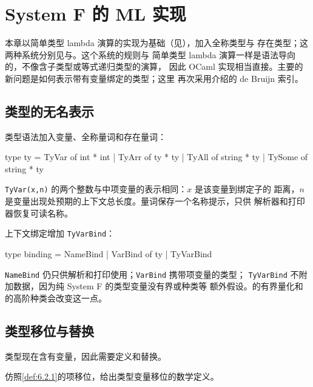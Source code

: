
\chapter{System F 的 ML 实现}
\label{chap:25}

本章以简单类型 lambda 演算的实现为基础（见），加入全称类型与
存在类型；这两种系统分别见与。这个系统的规则与
简单类型 lambda 演算一样是语法导向的，不像含子类型或等式递归类型的演算，
因此 OCaml 实现相当直接。主要的新问题是如何表示带有变量绑定的类型；这里
再次采用介绍的 de Bruijn 索引。

\section{类型的无名表示}
\label{sec:25.1}

类型语法加入变量、全称量词和存在量词：
\begin{taplocamlcode}
type ty =
    TyVar of int * int
  | TyArr of ty * ty
  | TyAll of string * ty
  | TySome of string * ty
\end{taplocamlcode}

\texttt{TyVar(x,n)} 的两个整数与中项变量的表示相同：\(x\) 是该变量到绑定子的
距离，\(n\) 是变量出现处预期的上下文总长度。量词保存一个名称提示，只供
解析器和打印器恢复可读名称。

上下文绑定增加 \texttt{TyVarBind}：
\begin{taplocamlcode}
type binding =
    NameBind
  | VarBind of ty
  | TyVarBind
\end{taplocamlcode}

\texttt{NameBind} 仍只供解析和打印使用；\texttt{VarBind} 携带项变量的类型；
\texttt{TyVarBind} 不附加数据，因为纯 System F 的类型变量没有界或种类等
额外假设。的有界量化和的高阶种类会改变这一点。

\section{类型移位与替换}
\label{sec:25.2}

类型现在含有变量，因此需要定义和替换。

\begin{exercise}[\(\star\)]
\label{ex:25.2.1}
仿照\cref{def:6.2.1}的项移位，给出类型变量移位的数学定义。
\end{exercise}

